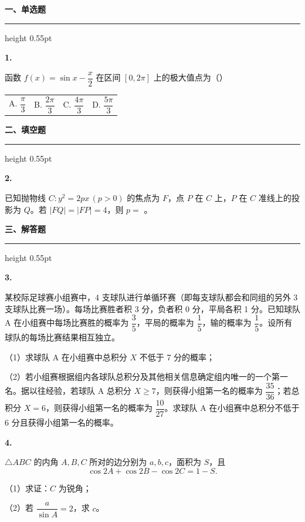 \documentclass[UTF8,12pt]{ctexart}
\newcommand{\notebooksection}[1]{%
  \vspace{0.8em}%
  {\fontsize{13.5pt}{17pt}\selectfont\bfseries #1\par}%
  \vspace{0.22em}%
  \hrule height 0.55pt
  \vspace{0.65em}%
}
\newcommand{\questionnumber}[1]{%
  {\bfseries #1.}\hspace{0.65em}%
}
\newcommand{\subquestion}[1]{%
  \par\vspace{0.35em}#1\par
}
\begin{document}
\notebooksection{一、单选题}

\questionnumber{1}
函数 $f(x)=\sin x-\dfrac{x}{2}$ 在区间 $[0,2\pi]$ 上的极大值点为（\quad）

\vspace{0.55em}
\begin{tabularx}{\textwidth}{@{}XXXX@{}}
A. $\dfrac{\pi}{3}$ &
B. $\dfrac{2\pi}{3}$ &
C. $\dfrac{4\pi}{3}$ &
D. $\dfrac{5\pi}{3}$
\end{tabularx}

\notebooksection{二、填空题}

\questionnumber{2}
已知抛物线 $C:y^2=2px\,(p>0)$ 的焦点为 $F$，点 $P$ 在 $C$ 上，$P$ 在 $C$ 准线上的投影为 $Q$。若 $|FQ|=|FP|=4$，则 $p=$ \underline{\hspace{3.2em}}。

\notebooksection{三、解答题}

\questionnumber{3}
某校际足球赛小组赛中，4 支球队进行单循环赛（即每支球队都会和同组的另外 3 支球队比赛一场）。每场比赛胜者积 3 分，负者积 0 分，平局各积 1 分。已知球队 A 在小组赛中每场比赛胜的概率为 $\dfrac{3}{5}$，平局的概率为 $\dfrac{1}{5}$，输的概率为 $\dfrac{1}{5}$。设所有球队的每场比赛结果相互独立。

\subquestion{（1）求球队 A 在小组赛中总积分 $X$ 不低于 7 分的概率；}

\subquestion{（2）若小组赛根据组内各球队总积分及其他相关信息确定组内唯一的一个第一名。据以往经验，若球队 A 总积分 $X\geq 7$，则获得小组第一名的概率为 $\dfrac{35}{36}$；若总积分 $X=6$，则获得小组第一名的概率为 $\dfrac{10}{27}$。求球队 A 在小组赛中总积分不低于 6 分且获得小组第一名的概率。}

\vspace{1.2em}
\questionnumber{4}
$\triangle ABC$ 的内角 $A,B,C$ 所对的边分别为 $a,b,c$，面积为 $S$，且
\[
  \cos 2A+\cos 2B-\cos 2C=1-S.
\]

\subquestion{（1）求证：$C$ 为锐角；}

\subquestion{（2）若 $\dfrac{a}{\sin A}=2$，求 $c$。}
\end{document}

